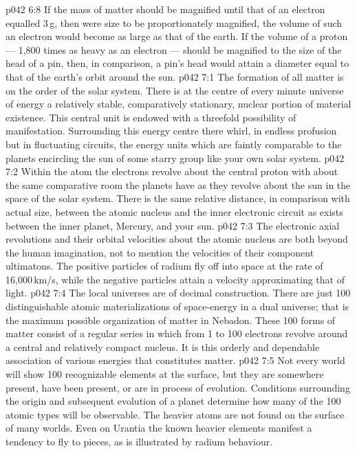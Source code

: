 \vs p042 6:8 \pc If the mass of matter should be magnified until that of an electron equalled 3\,g, then were size to be proportionately magnified, the volume of such an electron would become as large as that of the earth. If the volume of a proton --- 1,800 times as heavy as an electron --- should be magnified to the size of the head of a pin, then, in comparison, a pin’s head would attain a diameter equal to that of the earth’s orbit around the sun.
\vs p042 7:1 The formation of all matter is on the order of the solar system. There is at the centre of every minute universe of energy a relatively stable, comparatively stationary, nuclear portion of material existence. This central unit is endowed with a threefold possibility of manifestation. Surrounding this energy centre there whirl, in endless profusion but in fluctuating circuits, the energy units which are faintly comparable to the planets encircling the sun of some starry group like your own solar system.
\vs p042 7:2 \pc Within the atom the electrons revolve about the central proton with about the same comparative room the planets have as they revolve about the sun in the space of the solar system. There is the same relative distance, in comparison with actual size, between the atomic nucleus and the inner electronic circuit as exists between the inner planet, Mercury, and your sun.
\vs p042 7:3 The electronic axial revolutions and their orbital velocities about the atomic nucleus are both beyond the human imagination, not to mention the velocities of their component ultimatons. The positive particles of radium fly off into space at the rate of 16,000\,km/s, while the negative particles attain a velocity approximating that of light.
\vs p042 7:4 \pc The local universes are of decimal construction. There are just 100 distinguishable atomic materializations of space\hyp{}energy in a dual universe; that is the maximum possible organization of matter in Nebadon. These 100 forms of matter consist of a regular series in which from 1 to 100 electrons revolve around a central and relatively compact nucleus. It is this orderly and dependable association of various energies that constitutes matter.
\vs p042 7:5 Not every world will show 100 recognizable elements at the surface, but they are somewhere present, have been present, or are in process of evolution. Conditions surrounding the origin and subsequent evolution of a planet determine how many of the 100 atomic types will be observable. The heavier atoms are not found on the surface of many worlds. Even on Urantia the known heavier elements manifest a tendency to fly to pieces, as is illustrated by radium behaviour.
